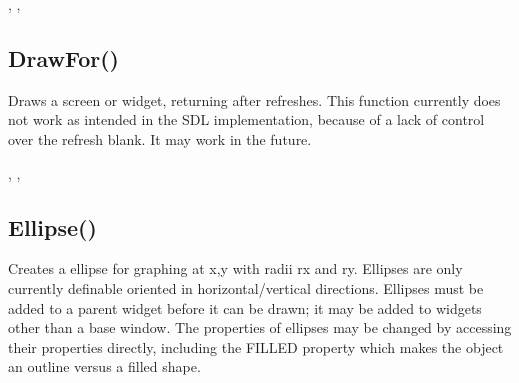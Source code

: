 \documentclass[letterpaper,10pt,english]{sphinxmanual}
\begin{document}
\sphinxAtStartPar
{}

\sphinxAtStartPar
{}, , 

\ignorespaces 

\subsection{DrawFor()}
\label{\detokenize{reference/peblobjects:drawfor}}\label{\detokenize{reference/peblobjects:index-4}}
\sphinxAtStartPar
{}

\sphinxAtStartPar
Draws a screen or widget, returning after    refreshes. This function currently does not work as   intended in the SDL implementation, because of a lack of control   over the refresh blank.  It may work in the future.

\sphinxAtStartPar
{}

\begin{sphinxVerbatim}[commandchars=\\\{\}]
\end{sphinxVerbatim}

\sphinxAtStartPar
{}

\sphinxAtStartPar
{}, , 

\ignorespaces 

\subsection{Ellipse()}
\label{\detokenize{reference/peblobjects:ellipse}}\label{\detokenize{reference/peblobjects:index-5}}
\sphinxAtStartPar
{}

\sphinxAtStartPar
{}

\sphinxAtStartPar
Creates a ellipse for graphing at x,y with radii   rx and ry. Ellipses are only currently definable oriented in   horizontal/vertical directions.  Ellipses  must be added   to a parent widget before it can be drawn; it may be added to   widgets other than a base window.  The properties of ellipses may be   changed by accessing their properties directly, including the FILLED   property which makes the object an outline versus a filled shape.
\end{document}
